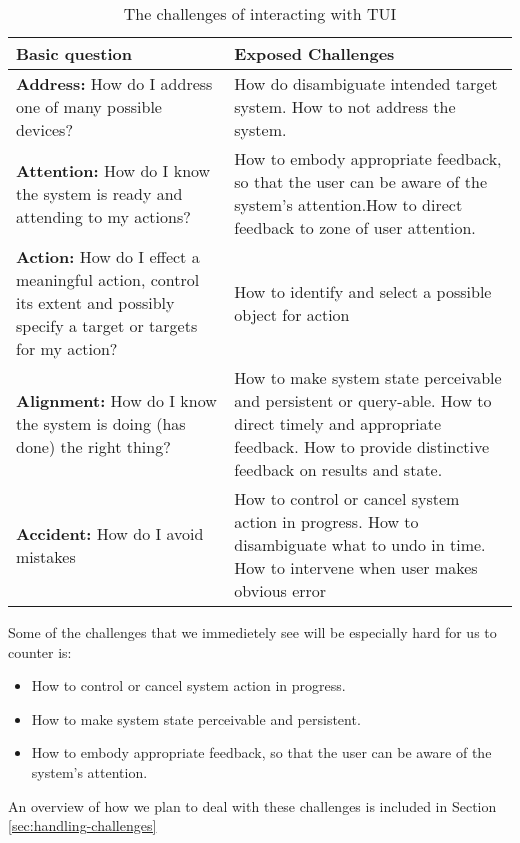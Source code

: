 \begin{table}[H]
	\begin{tabular}{| p{6.0cm} | p{7.0cm} |}
	\hline
	\textbf{Basic question} & \textbf{Exposed Challenges} \\
	\hline
	\textbf{Address:} How do I address one of many possible devices? & How do disambiguate intended target system. \newline How to not address the system. \\ 
	\hline
	\textbf{Attention:} How do I know the system is ready and attending to my actions? & How to embody appropriate feedback, so that the user can be aware of the system's attention.\newline How to direct feedback to zone of user attention. \\
	\hline
	\textbf{Action:} How do I effect a meaningful action, control its extent and possibly specify a target or targets for my action? & How to identify and select a possible object for action \\
	\hline
	\textbf{Alignment:} How do I know the system is doing (has done) the right thing? & How to make system state perceivable and persistent or query-able. \newline How to direct timely and appropriate feedback. \newline How to provide distinctive feedback on results and state. \\ 
	\hline 
	\textbf{Accident:} How do I avoid mistakes & How to control or cancel system action in progress. \newline How to disambiguate what to undo in time. \newline How to intervene when user makes obvious error \\
	\hline
	\end{tabular}
	\caption{The challenges of interacting with TUI \cite{bellotti2002making}}
	\label{tab:tuichallenges}
\end{table}

Some of the challenges that we immedietely see will be especially hard for us to counter is:
\begin{itemize}
  \item How to control or cancel system action in progress.
  \item How to make system state perceivable and persistent. 
  \item How to embody appropriate feedback, so that the user can be aware of the system's attention. 
\end{itemize} 
An overview of how we plan to deal with these challenges is included in Section \ref{sec:handling-challenges}
 

